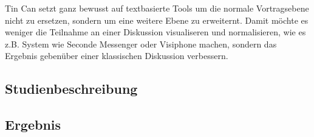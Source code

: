 Tin Can setzt ganz bewusst auf textbasierte Tools um die normale Vortragsebene
nicht zu ersetzen, sondern um eine weitere Ebene zu erweiternt. Damit möchte es
weniger die Teilnahme an einer Diskussion visualiseren und normalisieren, wie es
z.B. System wie Seconde Messenger oder Visiphone machen, sondern das Ergebnis
gebenüber einer klassischen Diskussion verbessern.

\subsection{Studienbeschreibung}


\subsection{Ergebnis}

